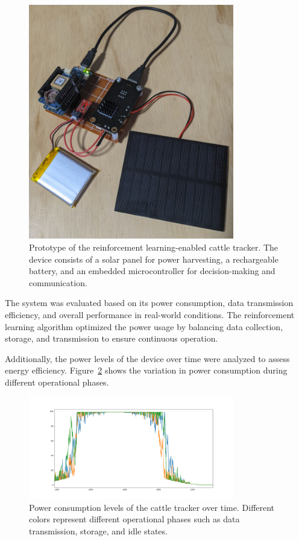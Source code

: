 \documentclass[10pt]{cai}
\begin{document}
\begin{figure}[htbp]
  \centering
  \includegraphics[width=0.8\textwidth]{./figs/prototype.png}
  \caption{Prototype of the reinforcement learning-enabled cattle tracker. The device consists of a solar panel for power harvesting, a rechargeable battery, and an embedded microcontroller for decision-making and communication.}
  \label{fig:prototype}
\end{figure}

The system was evaluated based on its power consumption, data transmission efficiency, and overall performance in real-world conditions. The reinforcement learning algorithm optimized the power usage by balancing data collection, storage, and transmission to ensure continuous operation.

Additionally, the power levels of the device over time were analyzed to assess energy efficiency. Figure~\ref{fig:power_levels} shows the variation in power consumption during different operational phases.

\begin{figure}[htbp]
    \centering
    \includegraphics[width=0.8\textwidth]{./figs/power_levels.png}
    \caption{Power consumption levels of the cattle tracker over time. Different colors represent different operational phases such as data transmission, storage, and idle states.}
    \label{fig:power_levels}
\end{figure}
\end{document}
